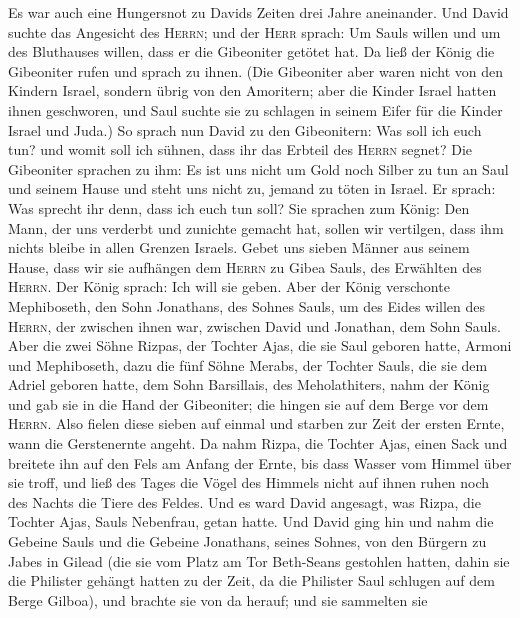  Es war auch eine Hungersnot zu Davids Zeiten drei Jahre
aneinander. Und David suchte das Angesicht des \textsc{Herrn}; und der
\textsc{Herr} sprach: Um Sauls willen und um des Bluthauses willen, dass
er die Gibeoniter getötet hat.  Da ließ der König die
Gibeoniter rufen und sprach zu ihnen. (Die Gibeoniter aber waren nicht
von den Kindern Israel, sondern übrig von den Amoritern; aber die Kinder
Israel hatten ihnen geschworen, und Saul suchte sie zu schlagen in
seinem Eifer für die Kinder Israel und Juda.)  So sprach
nun David zu den Gibeonitern: Was soll ich euch tun? und womit soll ich
sühnen, dass ihr das Erbteil des \textsc{Herrn} segnet? 
Die Gibeoniter sprachen zu ihm: Es ist uns nicht um Gold noch Silber zu
tun an Saul und seinem Hause und steht uns nicht zu, jemand zu töten in
Israel. Er sprach: Was sprecht ihr denn, dass ich euch tun soll?
 Sie sprachen zum König: Den Mann, der uns verderbt und
zunichte gemacht hat, sollen wir vertilgen, dass ihm nichts bleibe in
allen Grenzen Israels.  Gebet uns sieben Männer aus seinem
Hause, dass wir sie aufhängen dem \textsc{Herrn} zu Gibea Sauls, des
Erwählten des \textsc{Herrn}. Der König sprach: Ich will sie geben.
 Aber der König verschonte Mephiboseth, den Sohn
Jonathans, des Sohnes Sauls, um des Eides willen des \textsc{Herrn}, der
zwischen ihnen war, zwischen David und Jonathan, dem Sohn Sauls.
 Aber die zwei Söhne Rizpas, der Tochter Ajas, die sie
Saul geboren hatte, Armoni und Mephiboseth, dazu die fünf Söhne Merabs,
der Tochter Sauls, die sie dem Adriel geboren hatte, dem Sohn
Barsillais, des Meholathiters, nahm der König  und gab sie
in die Hand der Gibeoniter; die hingen sie auf dem Berge vor dem
\textsc{Herrn}. Also fielen diese sieben auf einmal und starben zur Zeit
der ersten Ernte, wann die Gerstenernte angeht.  Da nahm
Rizpa, die Tochter Ajas, einen Sack und breitete ihn auf den Fels am
Anfang der Ernte, bis dass Wasser vom Himmel über sie troff, und ließ
des Tages die Vögel des Himmels nicht auf ihnen ruhen noch des Nachts
die Tiere des Feldes.  Und es ward David angesagt, was
Rizpa, die Tochter Ajas, Sauls Nebenfrau, getan hatte. 
Und David ging hin und nahm die Gebeine Sauls und die Gebeine Jonathans,
seines Sohnes, von den Bürgern zu Jabes in Gilead (die sie vom Platz am
Tor Beth-Seans gestohlen hatten, dahin sie die Philister gehängt hatten
zu der Zeit, da die Philister Saul schlugen auf dem Berge Gilboa),
 und brachte sie von da herauf; und sie sammelten sie

